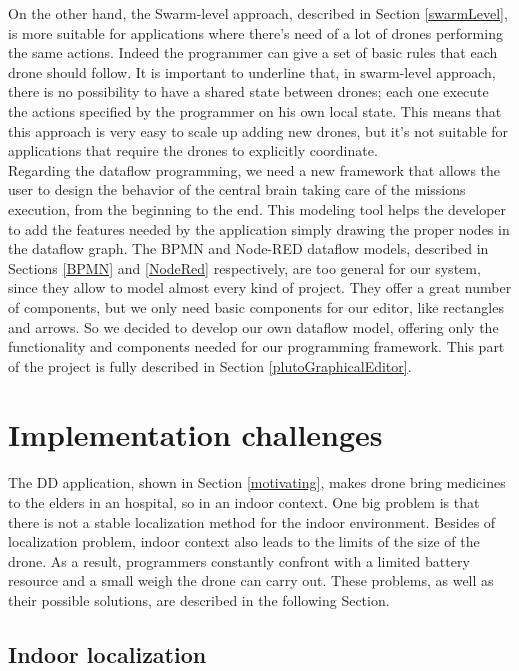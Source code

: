 On the other hand, the Swarm-level approach, described in Section \ref{swarmLevel}, is more suitable for applications where there’s need of a lot of drones performing the same actions.
Indeed the programmer can give a set of basic rules that each drone should follow. It is important to underline that, in swarm-level approach, there is no possibility to have a shared state between drones; each one execute the actions specified by the programmer on his own local state. This means that this approach is very easy to scale up adding new drones, but it’s not suitable for applications that require the drones to explicitly coordinate.
\\

Regarding the dataflow programming, we need a new framework that allows the user to design the behavior of the central brain taking care of the missions execution, from the beginning to the end. 
This modeling tool helps the developer to add the features needed by the application simply drawing the proper nodes in the dataflow graph. 
The BPMN and Node-RED dataflow models, described in Sections \ref{BPMN} and \ref{NodeRed} respectively, are too general for our system, since they allow to model almost every kind of project.
They offer a great number of components, but we only need basic components for our editor, like rectangles and arrows.
So we decided to develop our own dataflow model, offering only the functionality and components needed for our programming framework.
This part of the project is fully described in Section \ref{plutoGraphicalEditor}.

\section {Implementation challenges}\label{challenges}

The DD application, shown in Section \ref{motivating}, makes drone bring medicines to the elders in an hospital, so in an indoor context.
One big problem is that there is not a stable localization method for the indoor environment.
Besides of localization problem, indoor context also leads to the limits of the size of the drone.
As a result, programmers constantly confront with a limited battery resource and a small weigh the drone can carry out. These problems, as well as their possible solutions, are described in the following Section.

\subsection{Indoor localization}\label{indoor}

